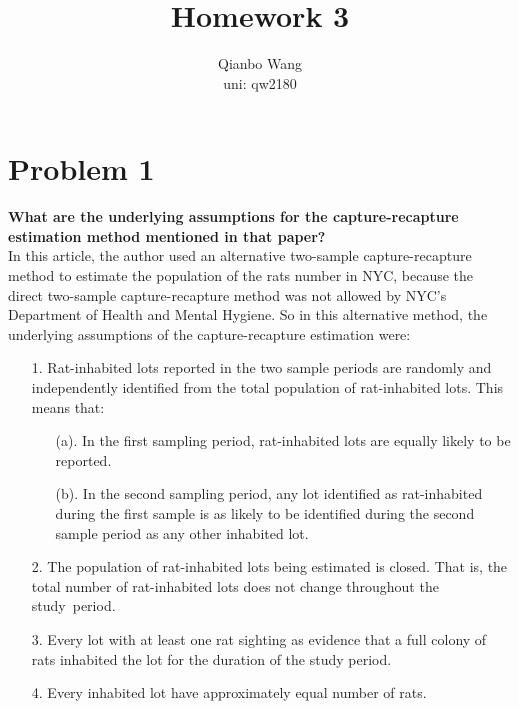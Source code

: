 \documentclass[10pt,letterpaper]{article}
\title{\textbf {Homework 3}}
\author{{Qianbo Wang}\\{uni: qw2180}}
\date{}
\begin{document}
\maketitle
\thispagestyle{fancy}
\vspace{-2em}
\section*{Problem 1}
\textbf{What are the underlying assumptions for the capture-recapture estimation method mentioned in that paper?}\\

In this article, the author used an alternative two-sample capture-recapture method to estimate the population of the rats number in NYC, because the direct two-sample capture-recapture method was not allowed by NYC’s Department of Health and Mental Hygiene. So in this alternative method, the underlying assumptions of the capture-recapture estimation were:\\
\begin{enumerate}[leftmargin=0cm,itemindent=.5cm,labelwidth=\itemindent,labelsep=0cm,align=left]
\item[1. ] Rat-inhabited lots reported in the two sample periods are randomly and independently identified from the total population of rat-inhabited lots. This means that:
\begin{enumerate}[leftmargin=0cm,itemindent=.5cm,labelwidth=\itemindent,labelsep=0cm,align=left]
\item[(a). ] In the first sampling period, rat-inhabited lots are equally likely to be reported.

\item[(b). ] In the second sampling period, any lot identified as rat-inhabited during the first sample is as likely to be identified during the second sample period as any other inhabited lot. 
\end{enumerate}
\item[2. ] The population of rat-inhabited lots being estimated is closed. That is, the total number of rat-inhabited lots does not change throughout the study period. 

\item[3. ] Every lot with at least one rat sighting as evidence that a full colony of rats inhabited the lot for the duration of the study period. 

\item[4. ] Every inhabited lot have approximately equal number of rats.
\end{enumerate}
\end{document}
